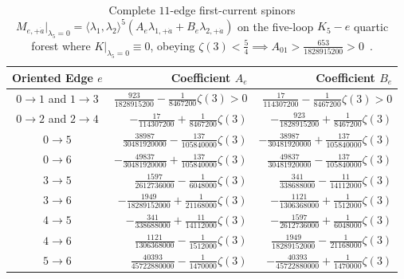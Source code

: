 \begin{table}[H]
\centering
\scriptsize
\setlength{\tabcolsep}{6pt}
\renewcommand{\arraystretch}{1.15}
\begin{tabular}{@{}crr@{}}
\toprule
\textbf{Oriented Edge $e$} & \textbf{Coefficient $A_e$} & \textbf{Coefficient $B_e$} \\
\midrule
$0\to 1$ and $1\to 3$ & $\frac{923}{1828915200} - \frac{1}{8467200}\zeta(3) > 0$ & $\frac{17}{114307200} - \frac{1}{8467200}\zeta(3) > 0$ \\
$0\to 2$ and $2\to 4$ & $-\frac{17}{114307200} + \frac{1}{8467200}\zeta(3)$ & $-\frac{923}{1828915200} + \frac{1}{8467200}\zeta(3)$ \\
$0\to 5$ & $\frac{38987}{30481920000} - \frac{137}{105840000}\zeta(3)$ & $-\frac{38987}{30481920000} + \frac{137}{105840000}\zeta(3)$ \\
$0\to 6$ & $-\frac{49837}{30481920000} + \frac{137}{105840000}\zeta(3)$ & $\frac{49837}{30481920000} - \frac{137}{105840000}\zeta(3)$ \\
$3\to 5$ & $\frac{1597}{2612736000} - \frac{1}{6048000}\zeta(3)$ & $\frac{341}{338688000} - \frac{11}{14112000}\zeta(3)$ \\
$3\to 6$ & $-\frac{1949}{18289152000} + \frac{1}{21168000}\zeta(3)$ & $-\frac{1121}{1306368000} + \frac{1}{1512000}\zeta(3)$ \\
$4\to 5$ & $-\frac{341}{338688000} + \frac{11}{14112000}\zeta(3)$ & $-\frac{1597}{2612736000} + \frac{1}{6048000}\zeta(3)$ \\
$4\to 6$ & $\frac{1121}{1306368000} - \frac{1}{1512000}\zeta(3)$ & $\frac{1949}{18289152000} - \frac{1}{21168000}\zeta(3)$ \\
$5\to 6$ & $\frac{40393}{45722880000} - \frac{1}{1470000}\zeta(3)$ & $-\frac{40393}{45722880000} + \frac{1}{1470000}\zeta(3)$ \\
\bottomrule
\end{tabular}
\caption{Complete $11$-edge first-current spinors $M_{e,+\dot{a}}|_{\lambda_5=0} = \langle\lambda_1,\lambda_2\rangle^5(A_e\lambda_{1,+\dot{a}} + B_e\lambda_{2,+\dot{a}})$ on the five-loop $K_5-e$ quartic forest where $K|_{\lambda_5=0} \equiv 0$, obeying $\zeta(3) < \frac{5}{4} \implies A_{01} > \frac{653}{1828915200} > 0$~\cite{Repo9e833c8}.}
\label{tab:zero-marked-currents}
\end{table}

